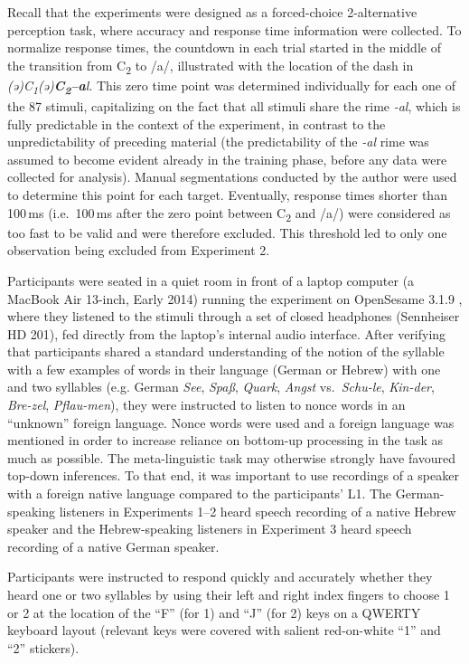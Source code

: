 Recall that the experiments were designed as a forced-choice 2-alternative perception task, where accuracy and response time information were collected.
To normalize response times, the countdown in each trial started in the middle of the transition from C\textsubscript{2} to /a/,
illustrated with the location of the dash in \emph{(ə)C\textsubscript{1}(ə)\textbf{C\textsubscript{2}--a}l}. This zero time point was determined individually for each one of the 87 stimuli, capitalizing on the fact that all stimuli share the rime \emph{-al}, which is fully predictable in the context of the experiment, in contrast to the unpredictability of preceding material (the predictability of the \emph{-al} rime was assumed to become evident already in the training phase, before any data were collected for analysis). Manual segmentations conducted by the author were used to determine this point for each target. Eventually, response times shorter than 100\,ms (i.e.~100\,ms after the zero point between C\textsubscript{2} and /a/) were considered as too fast to be valid and were therefore excluded. This threshold led to only one observation being excluded from Experiment 2.

Participants were seated in a quiet room in front of a laptop computer (a MacBook Air 13-inch, Early 2014) running the experiment on OpenSesame 3.1.9 \citep{mathot2012opensesame}, where they listened to the stimuli through a set of closed headphones (Sennheiser HD 201), fed directly from the laptop's internal audio interface. After verifying that participants shared a standard understanding of the notion of the syllable with a few examples of words in their language (German or Hebrew) with one and two syllables (e.g. German \emph{See}, \emph{Spaß}, \emph{Quark}, \emph{Angst} vs.~\emph{Schu-le}, \emph{Kin-der}, \emph{Bre-zel}, \emph{Pflau-men}), they were instructed to listen to nonce words in an \enquote{unknown} foreign language.
Nonce words were used and a foreign language was mentioned in order to increase reliance on bottom-up processing in the task as much as possible.
The meta-linguistic task may otherwise strongly have favoured top-down inferences.
To that end, it was important to use recordings of a speaker with a foreign native language compared to the participants' L1.
The German-speaking listeners in Experiments 1--2 heard speech recording of a native Hebrew speaker and the Hebrew-speaking listeners in Experiment 3 heard speech recording of a native German speaker.

Participants were instructed to respond quickly and accurately whether they heard one or two syllables by using their left and right index fingers to choose 1 or 2 at the location of the \enquote{F} (for 1) and \enquote{J} (for 2) keys on a QWERTY keyboard layout (relevant keys were covered with salient red-on-white \enquote{1} and \enquote{2} stickers).

